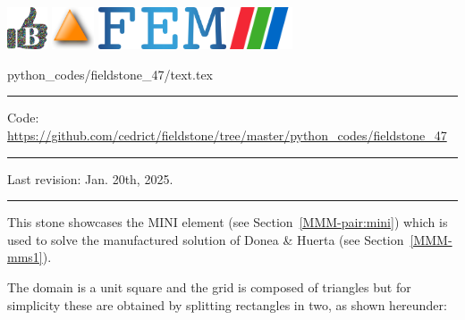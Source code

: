 \includegraphics[height=1.25cm]{images/pictograms/benchmark}
\includegraphics[height=1.25cm]{images/pictograms/triangle}
\includegraphics[height=1.25cm]{images/pictograms/FEM}
\includegraphics[height=1.25cm]{images/pictograms/paraview}


\begin{flushright} {\tiny {\color{gray} python\_codes/fieldstone\_47/text.tex}} \end{flushright}

%

\par\noindent\rule{\textwidth}{0.4pt}

\begin{center}
\inpython
{\small Code: \url{https://github.com/cedrict/fieldstone/tree/master/python_codes/fieldstone_47}}
\end{center}

\par\noindent\rule{\textwidth}{0.4pt}

Last revision: Jan. 20th, 2025.

\par\noindent\rule{\textwidth}{0.4pt}


This stone showcases the MINI element (see Section~\ref{MMM-pair:mini})
which is used to solve the manufactured solution of Donea \& Huerta (see Section~\ref{MMM-mms1}).

The domain is a unit square and the grid is composed of triangles but for simplicity these 
are obtained by splitting rectangles in two, as shown hereunder:

